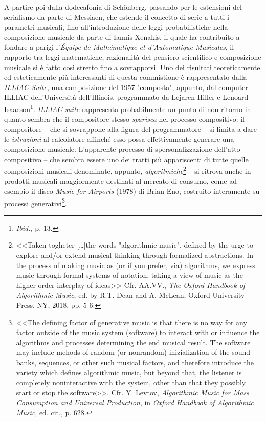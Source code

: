 \documentclass[a4paper,12pt]{scrartcl}
\newcommand{\omissis}{[\dots\unkern]}
\begin{document}
	A partire poi dalla dodecafonia di Sch{\"o}nberg, passando per le estensioni del serialismo da parte di Messiaen, che estende il concetto di serie a tutti i parametri musicali, fino all'introduzione delle leggi probabilistiche nella composizione musicale da parte di Iannis Xenakis, il quale ha contribuito a fondare a parigi l'\textit{Équipe de Mathématique et d'Automatique Musicales}, il rapporto tra leggi matematiche, razionalità del pensiero scientifico e composizione musicale si è fatto così stretto fino a sovrapporsi. Uno dei risultati teoreticamente ed esteticamente più interessanti di questa commistione è rappresentato dalla \emph{ILLIAC Suite}, una composizione del 1957 "composta", appunto, dal computer ILLIAC dell'Università dell'Illinois, programmato da Lejaren Hiller e Lenoard Isaacson\footnote{\textit{Ibid.,} p. 13.}. 
	\emph{ILLIAC suite} rappresenta probabilmente un punto di non ritorno in quanto sembra che il compositore stesso \emph{sparisca} nel processo compositivo: il compositore -- che si sovrappone alla figura del programmatore -- si limita a dare le \emph{istruzioni} al calcolatore affinché esso possa effettivamente generare una composizione musicale. L'apparente processo di spersonalizzazione dell'atto compositivo -- che sembra essere uno dei tratti più appariscenti di tutte quelle composizioni musicali denominate, appunto, \emph{algoritmiche}\footnote{<<Taken togheter \omissis the words "algorithmic music", defined by the urge to explore and/or extend musical thinking through formalized abstractions. In the process of making music as (or if you prefer, via) algorithms, we express music through formal systems of notation, taking a view of music as the higher order interplay of ideas>> Cfr. AA.VV., \textit{The Oxford Handbook of Algorithmic Music}, ed. by R.T. Dean and A. McLean, Oxford University Press, NY, 2018, pp. 5-6.} 
	-- si ritrova anche in prodotti musicali maggiormente destinati al mercato di consumo, come ad esempio il disco \textit{Music for Airports} (1978) di Brian Eno, costruito interamente su processi generativi\footnote{<<The defining factor of generative music is that there is no way for any factor outside of the music system (software) to interact with or influence the algorithms and processes determining the end musical result. The software may include mehods of random (or nonrandom) inizialization of the sound banks, sequences, or other such musical factors, and therefore introduce the variety which defines algorithmic music, but beyond that, the listener is completely noninteractive with the system, other than that they possibly start or stop the software>>. Cfr. Y. Levtov, \textit{Algorithmic Music for Mass Consumption and Universal Production}, in \textit{Oxford Handbook of Algorithmic Music}, ed. cit., p. 628.}. 
\end{document}
